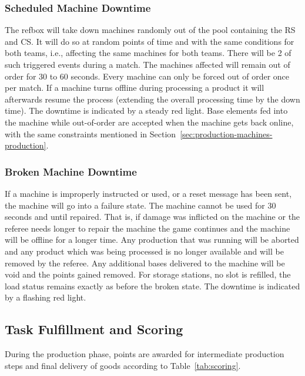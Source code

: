 \documentclass[12pt,twoside]{article}
\newcommand{\refsec}[1]{Section~\ref{#1}}
\newcommand{\reftab}[1]{Table~\ref{#1}}
\begin{document}
\subsubsection{Scheduled Machine Downtime}
\label{sec:out-of-order}
The refbox will take down machines randomly out of the pool containing
the RS and CS. It will do so at random points of time and with the
same conditions for both teams, i.e., affecting the same machines for
both teams. There will be 2 of such triggered events during a
match. The machines affected will remain out of order for 30 to 60
seconds. Every machine can only be forced out of order once per
match. If a machine turns offline during processing a product it will
afterwards resume the process (extending the overall processing time
by the down time). The downtime is indicated by a steady red
light. Base elements fed into the machine while out-of-order are
accepted when the machine gets back online, with the same constraints
mentioned in \refsec{sec:production-machines-production}.

\subsubsection{Broken Machine Downtime}
\label{sec:broken-machine}
If a machine is improperly instructed or used, or a reset message has
been sent, the machine will go into a failure state. The machine cannot be
used for 30 seconds and until repaired. That is, if damage was
inflicted on the machine or the referee needs longer to repair the
machine the game continues and the machine will be offline for a
longer time. Any production that was running will be aborted and any
product which was being processed is no longer available and will be
removed by the referee. Any additional bases delivered to the machine
will be void and the points gained removed. For storage stations, no
slot is refilled, the load status remains exactly as before the broken
state. The downtime is indicated by a flashing red light.

\subsection{Task Fulfillment and Scoring}
\label{sec:production-scoring}
During the production phase, points are awarded for intermediate
production steps and final delivery of goods according to
\reftab{tab:scoring}.
\end{document}
